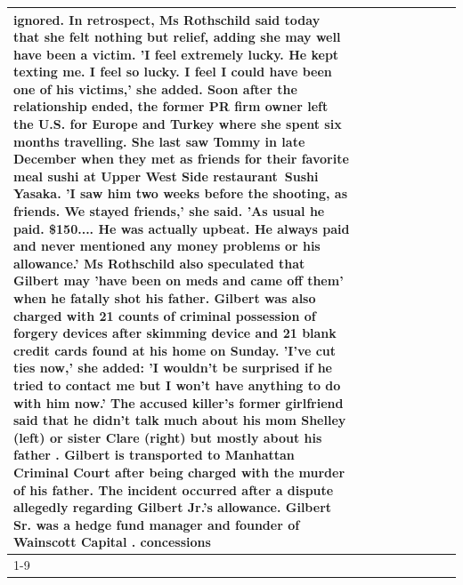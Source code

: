\begin{table}[H]
\begin{tabular}{lllrlllll}
ignored. In retrospect, Ms Rothschild said today that she felt nothing but relief, adding she may well have been a victim. 'I feel extremely lucky. He kept texting me. I feel so lucky. I feel I could have been one of his victims,' she added. Soon after the relationship ended, the former PR firm owner left the U.S. for Europe and Turkey where she spent six months  travelling. She last saw Tommy in late December when they met as friends for their favorite meal sushi at Upper West Side restaurant Sushi Yasaka. 'I saw him two weeks before the shooting, as friends. We stayed friends,' she said. 'As usual he paid. \$150.... He was actually upbeat. He always paid and never mentioned any money problems or his allowance.' Ms Rothschild also speculated that Gilbert may 'have been on meds and came off them' when he fatally shot his father. Gilbert was also charged with 21 counts of criminal possession of forgery devices after skimming device and 21 blank credit cards found at his home on Sunday. 'I've cut ties now,' she added: 'I wouldn’t be surprised if he tried to contact me but I won’t have anything to do with him now.' The accused killer's former girlfriend said that he didn't talk much about his mom Shelley (left) or sister Clare (right) but mostly about his father . Gilbert is transported to Manhattan Criminal Court  after being charged with the murder of his father. The incident occurred after a dispute allegedly regarding Gilbert Jr.'s allowance. Gilbert Sr. was a hedge fund manager and founder of Wainscott Capital . concessions \\
\cline{1-9}

\end{tabular}
\end{table}
